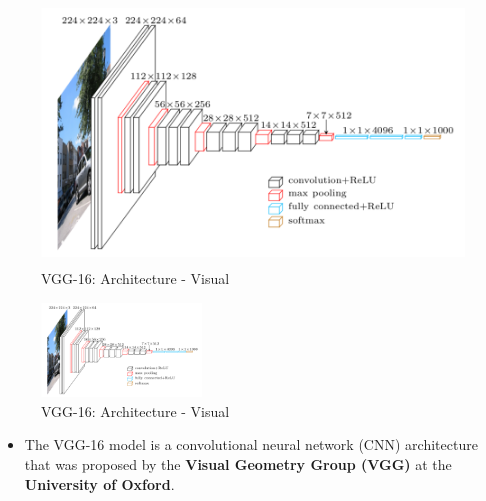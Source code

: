 \begin{figure}[h]
    \centering
    \includegraphics[width=\linewidth, height=7cm, keepaspectratio]{Pictures/convolutional-neural-network/vgg-16-1.png}
    \caption{VGG-16: Architecture - Visual}
\end{figure}
\begin{figure}[h]
    \centering
    \includegraphics[width=\linewidth, height=2.5cm, keepaspectratio]{Pictures/convolutional-neural-network/vgg-16-1.png}
    \caption{VGG-16: Architecture - Visual}
\end{figure}

\begin{itemize}
    \item The VGG-16 model is a convolutional neural network (CNN) architecture that was proposed by the \textbf{Visual Geometry Group (VGG)} at the \textbf{University of Oxford}.
\end{itemize}

